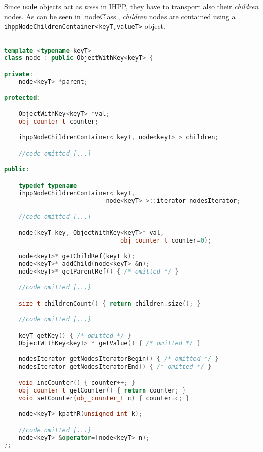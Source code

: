 \documentclass[a4paper,10pt]{report}
\begin{document}
Since \verb|node| objects act as \emph{trees} in IHPP, they have to transport
also their \emph{children} nodes. As can be seen in \cref{nodeClass},
\emph{children} nodes are contained using a
\verb|ihppNodeChildrenContainer<keyT,valueT>| object.

\begin{lstlisting}[language=C++,
	caption={partial definition of \texttt{node<keyT>} class},
	label=nodeClass, frame=leftline]

template <typename keyT>
class node : public ObjectWithKey<keyT> {

private:
	node<keyT> *parent;

protected:

	ObjectWithKey<keyT> *val;
	obj_counter_t counter;

	ihppNodeChildrenContainer< keyT, node<keyT> > children;

	//code omitted [...]

public:

	typedef typename
	ihppNodeChildrenContainer< keyT,
							node<keyT> >::iterator nodesIterator;

	//code omitted [...]

	node(keyT key, ObjectWithKey<keyT>* val,
								obj_counter_t counter=0);

	node<keyT>* getChildRef(keyT k);
	node<keyT>* addChild(node<keyT> &n);
	node<keyT>* getParentRef() { /* omitted */ }

	//code omitted [...]

	size_t childrenCount() { return children.size(); }

	//code omitted [...]

	keyT getKey() { /* omitted */ }
	ObjectWithKey<keyT> * getValue() { /* omitted */ }

	nodesIterator getNodesIteratorBegin() { /* omitted */ }
	nodesIterator getNodesIteratorEnd() { /* omitted */ }

	void incCounter() { counter++; }
	obj_counter_t getCounter() { return counter; }
	void setCounter(obj_counter_t c) { counter=c; }

	node<keyT> kpathR(unsigned int k);

	//code omitted [...]
	node<keyT> &operator=(node<keyT> n);
};

\end{lstlisting}
\end{document}
